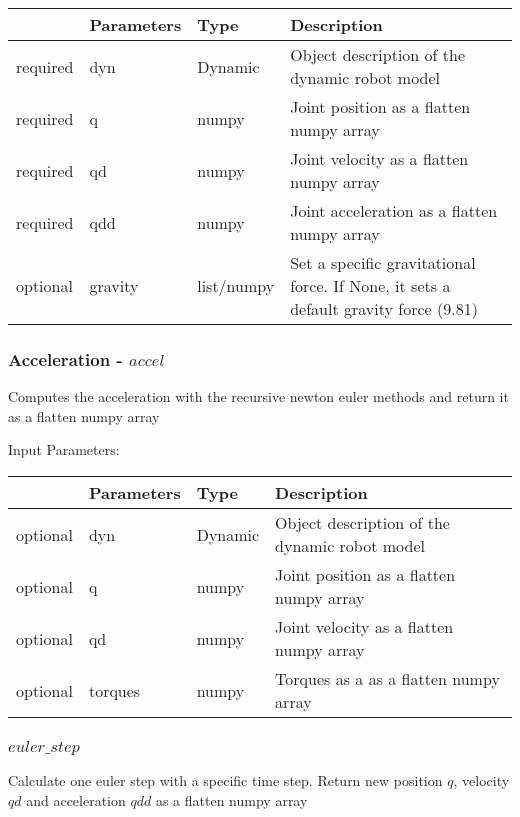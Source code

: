 \documentclass[
	ngerman,
	accentcolor=9c,%
	type=intern,
	marginpar=false
	]{tudapub}
\begin{document}
\begin{tabular}{|p{}|p{}|p{}| p{}|}
\hline
 & \textbf{Parameters} & \textbf{Type} & \textbf{Description} \\
\hline
required & dyn & Dynamic & Object description of the dynamic robot model \\
\hline
required & q & numpy & Joint position as a flatten numpy array \\
\hline
required & qd & numpy & Joint velocity as a flatten numpy array \\
\hline
required & qdd & numpy & Joint acceleration as a flatten numpy array \\
\hline
optional & gravity & list/numpy & Set a specific gravitational force. If None, it sets a default gravity force (9.81) \\
\hline
\end{tabular}

\vspace{0.5cm}
\subsubsection{Acceleration - $accel$}
\noindent Computes the acceleration with the recursive newton euler methods  and return it  as a flatten numpy array

\vspace{0.5cm}
\noindent Input Parameters:
\vspace{0.5cm}

\begin{tabular}{|p{}|p{}|p{}| p{}|}
\hline
 & \textbf{Parameters} & \textbf{Type} & \textbf{Description} \\
\hline
optional & dyn & Dynamic & Object description of the dynamic robot model \\
\hline
optional & q & numpy & Joint position as a flatten numpy array \\
\hline
optional & qd & numpy & Joint velocity as a flatten numpy array \\
\hline
optional & torques & numpy & Torques as a as a flatten numpy array \\
\hline
\end{tabular}


\subsubsection{$euler\_step$}
\noindent Calculate one euler step with a specific time step. Return new position $q$, velocity $qd$ and acceleration $qdd$ as a flatten numpy array
\end{document}
